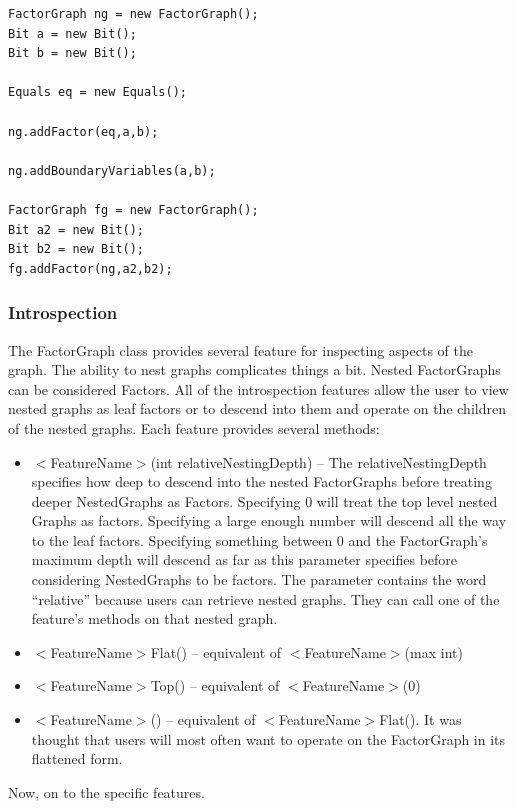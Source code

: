 \ifjava
\begin{lstlisting}
FactorGraph ng = new FactorGraph();
Bit a = new Bit();
Bit b = new Bit();
		
Equals eq = new Equals();
		
ng.addFactor(eq,a,b);
		
ng.addBoundaryVariables(a,b);
		
FactorGraph fg = new FactorGraph();
Bit a2 = new Bit();
Bit b2 = new Bit();
fg.addFactor(ng,a2,b2);
\end{lstlisting}
\fi

\subsubsection{Introspection}

The FactorGraph class provides several feature for inspecting aspects of the graph.  The ability to nest graphs complicates things a bit.  Nested FactorGraphs can be considered Factors.  All of the introspection features allow the user to view nested graphs as leaf factors or to descend into them and operate on the children of the nested graphs.  Each feature provides several methods:

\begin{itemize}
\item $<$FeatureName$>$(int relativeNestingDepth) -- The relativeNestingDepth specifies how deep to descend into the nested FactorGraphs before treating deeper NestedGraphs as Factors.  Specifying 0 will treat the top level nested Graphs as factors.  Specifying a large enough number will descend all the way to the leaf factors.  Specifying something between 0 and the FactorGraph's maximum depth will descend as far as this parameter specifies before considering NestedGraphs to be factors.  The parameter contains the word ``relative'' because users can retrieve nested graphs.  They can call one of the feature's methods on that nested graph.  
\item $<$FeatureName$>$Flat() -- equivalent of $<$FeatureName$>$(max int)
\item $<$FeatureName$>$Top() -- equivalent of $<$FeatureName$>$(0)
\item $<$FeatureName$>$() -- equivalent of $<$FeatureName$>$Flat().  It was thought that users will most often want to operate on the FactorGraph in its flattened form.
\end{itemize}

Now, on to the specific features.


